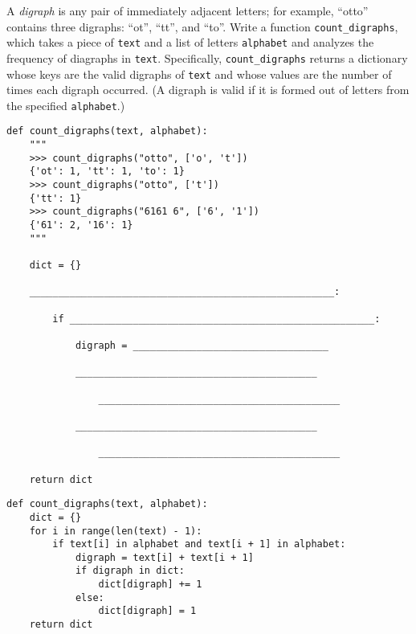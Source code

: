 \begin{blocksection}
\question A \textit{digraph} is any pair of immediately adjacent letters; for example, ``otto'' contains three digraphs: ``ot'', ``tt'', and ``to''. Write a function \lstinline{count_digraphs}, which takes a piece of \lstinline{text} and a list of letters \lstinline{alphabet} and analyzes the frequency of diagraphs in \lstinline{text}. Specifically, \lstinline{count_digraphs} returns a dictionary whose keys are the valid digraphs of \lstinline{text} and whose values are the number of times each digraph occurred. (A digraph is valid if it is formed out of letters from the specified \lstinline{alphabet}.)

\begin{lstlisting}
def count_digraphs(text, alphabet):
    """
    >>> count_digraphs("otto", ['o', 't'])
    {'ot': 1, 'tt': 1, 'to': 1}
    >>> count_digraphs("otto", ['t'])
    {'tt': 1}
    >>> count_digraphs("6161 6", ['6', '1'])
    {'61': 2, '16': 1}
    """

    dict = {}

    _____________________________________________________:

        if _____________________________________________________:

            digraph = __________________________________

            __________________________________________

                __________________________________________

            __________________________________________

                __________________________________________

    return dict
\end{lstlisting}
\end{blocksection}
\newpage
\begin{solution}
\begin{lstlisting}
def count_digraphs(text, alphabet):
    dict = {}
    for i in range(len(text) - 1):
        if text[i] in alphabet and text[i + 1] in alphabet:
            digraph = text[i] + text[i + 1]
            if digraph in dict:
                dict[digraph] += 1
            else: 
                dict[digraph] = 1
    return dict
\end{lstlisting}
\end{solution}


